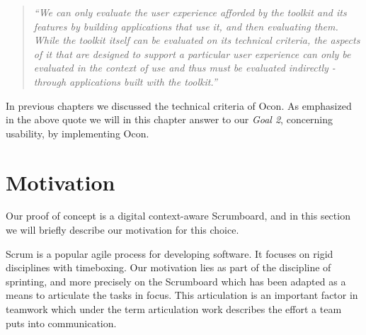 \documentclass[../report.tex]{subfiles}
\begin{document}
\graphicspath{{img/}{../img/}}




\blockquote{
\textit{``We can only evaluate the user experience afforded by the toolkit and its features by building applications that use it, and then evaluating them. While the toolkit itself can be evaluated on its technical criteria, the aspects of it that are designed to support a particular user experience can only be evaluated in the context of use and thus must be evaluated indirectly - through applications built with the toolkit.''} \cite{Infrastructure (2003)} \\}

In previous chapters we discussed the technical criteria of Ocon. As emphasized in the above quote we will in this chapter answer to our \textit{Goal 2}, concerning usability, by implementing Ocon.

\section{Motivation}

Our proof of concept is a digital context-aware Scrumboard, and in this section we will briefly describe our motivation for this choice.





Scrum is a popular agile process for developing software. It focuses on rigid disciplines with timeboxing. Our motivation lies as part of the discipline of sprinting, and more precisely on the Scrumboard which has been adapted as a means to articulate the tasks in focus. This articulation is an important factor in teamwork which under the term articulation work describes the effort a team puts into communication\cite[IV]{Why Scrum works (2011)}.
\end{document}
